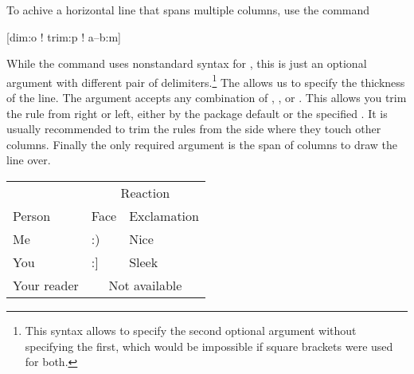 To achive a horizontal line that spans multiple columns, use the command
\begin{lscommand}
  [dim:o ! trim:p ! a--b:m]
\end{lscommand}
While the command uses nonstandard syntax for , this is just an
optional argument with different pair of delimiters.\footnote{This syntax
allows to specify the second optional argument without specifying the first,
which would be impossible if square brackets were used for both.} The
 allows us to specify the thickness of the line. The 
argument accepts any combination of , ,
 or . This allows you trim the rule from right
or left, either by the package default or the specified . It is
usually recommended to trim the rules from the side where they touch other
columns. Finally the only required argument  is the span of columns
to draw the line over.
\begin{example}[examplewidth=0.43\linewidth]
\begin{tabular}{@{}lll@{}}
  \toprule
              & \multicolumn{2}{c}{
                  Reaction}        \\
  \cmidrule(l){2-3}
  Person      & Face & Exclamation \\
  \midrule
  Me          & :)   & Nice        \\
  You         & :]   & Sleek       \\
  Your reader & \multicolumn{2}{c}{
                  Not available}   \\
  \bottomrule
\end{tabular}
\end{example}


